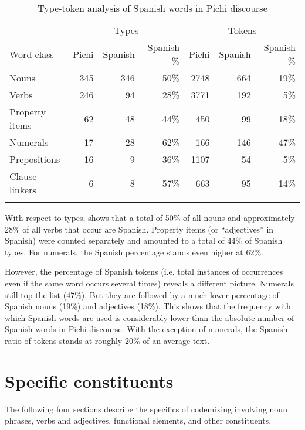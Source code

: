 \begin{table}
\caption{Type-token analysis of Spanish words in Pichi discourse}
\label{tab:key:13.2}

\begin{tabularx}{\textwidth}{l rrr rrr}
\lsptoprule
 & \multicolumn{3}{c}{ Types} & \multicolumn{3}{c}{ Tokens}\\
Word class & Pichi & Spanish & Spanish \% & Pichi & Spanish & Spanish \%\\
\midrule
Nouns & 345 & 346 & 50\% & 2748 & 664 & 19\%\\
Verbs & 246 & 94 & 28\% & 3771 & 192 & 5\%\\
Property items & 62 & 48 & 44\% & 450 & 99 & 18\%\\
Numerals & 17 & 28 & 62\% & 166 & 146 & 47\%\\
Prepositions & 16 & 9 & 36\% & 1107 & 54 & 5\%\\
Clause linkers & 6 & 8 & 57\% & 663 & 95 & 14\%\\
\lspbottomrule
\end{tabularx}
\end{table}

With respect to types,  shows that a total of 50\% of all nouns and approximately 28\% of all verbs that occur are Spanish. Property items (or “adjectives” in Spanish) were counted separately and amounted to a total of 44\% of Spanish types. For numerals, the Spanish percentage stands even higher at 62\%. 


However, the percentage of Spanish tokens (i.e. total instances of occurrences even if the same word occurs several times) reveals a different picture. Numerals still top the list (47\%). But they are followed by a much lower percentage of Spanish nouns (19\%) and adjectives (18\%). This shows that the frequency with which Spanish words are used is considerably lower than the absolute number of Spanish words in Pichi discourse. With the exception of numerals, the Spanish ratio of tokens stands at roughly 20\% of an average text. 


\section{Specific constituents}\label{sec:13.2}

The following four sections describe the specifics of codemixing involving noun phrases, verbs and adjectives, functional elements, and other constituents.

